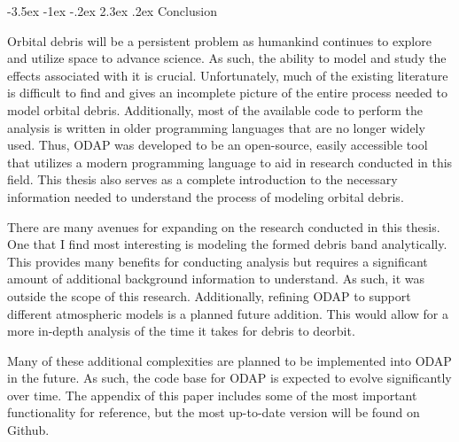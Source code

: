\documentclass[a4paper, 12pt]{article}
\makeatletter
\renewcommand\section{\clearpage\newpage\@startsection {section}{1}{\z@}%
	{-3.5ex \@plus -1ex \@minus -.2ex}%
	{2.3ex \@plus.2ex}%
	{\normalfont\Large\bfseries}}
\makeatother
\begin{document}
\section{Conclusion}

Orbital debris will be a persistent problem as humankind continues to explore and utilize space to advance science. As such, the ability to model and study the effects associated with it is crucial. Unfortunately, much of the existing literature is difficult to find and gives an incomplete picture of the entire process needed to model orbital debris. Additionally, most of the available code to perform the analysis is written in older programming languages that are no longer widely used. Thus, ODAP was developed to be an open-source, easily accessible tool that utilizes a modern programming language to aid in research conducted in this field. This thesis also serves as a complete introduction to the necessary information needed to understand the process of modeling orbital debris.

There are many avenues for expanding on the research conducted in this thesis. One that I find most interesting is modeling the formed debris band analytically. This provides many benefits for conducting analysis but requires a significant amount of additional background information to understand. As such, it was outside the scope of this research. Additionally, refining ODAP to support different atmospheric models is a planned future addition. This would allow for a more in-depth analysis of the time it takes for debris to deorbit.

Many of these additional complexities are planned to be implemented into ODAP in the future. As such, the code base for ODAP is expected to evolve significantly over time. The appendix of this paper includes some of the most important functionality for reference, but the most up-to-date version will be found on Github.





\printindex


\end{document}
